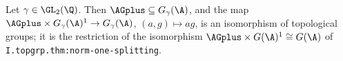 Let $\gamma\in\GL_2(\Q)$. Then $\AGplus\subseteq G_\gamma(\A)$, and the map $\AGplus\times G_\gamma(\A)^1\to G_\gamma(\A)$,
$(a,g)\mapsto ag$, is an isomorphism of topological groups; it is the restriction of the isomorphism
$\AGplus\times G(\A)^1\cong G(\A)$ of \texttt{I.topgrp.thm:norm-one-splitting}.

